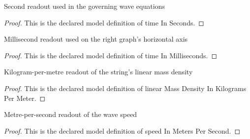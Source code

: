 \begin{definition}
  \label{def:physics:phyx-mini-0293:phyxminiproblems-problemphyxmini0293-timeinseconds}
  Second readout used in the governing wave equations
\end{definition}
\begin{proof}
  This is the declared model definition of time In Seconds.
\end{proof}
\begin{definition}
  \label{def:physics:phyx-mini-0293:phyxminiproblems-problemphyxmini0293-timeinmilliseconds}
  Millisecond readout used on the right graph's horizontal axis
\end{definition}
\begin{proof}
  This is the declared model definition of time In Milliseconds.
\end{proof}
\begin{definition}
  \label{def:physics:phyx-mini-0293:phyxminiproblems-problemphyxmini0293-linearmassdensityinkilogramspermeter}
  Kilogram-per-metre readout of the string's linear mass density
\end{definition}
\begin{proof}
  This is the declared model definition of linear Mass Density In Kilograms Per Meter.
\end{proof}
\begin{definition}
  \label{def:physics:phyx-mini-0293:phyxminiproblems-problemphyxmini0293-speedinmeterspersecond}
  Metre-per-second readout of the wave speed
\end{definition}
\begin{proof}
  This is the declared model definition of speed In Meters Per Second.
\end{proof}
